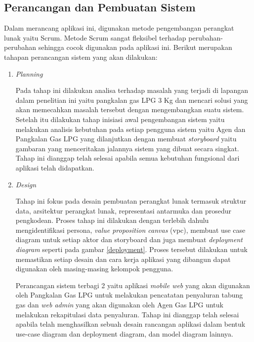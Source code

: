 \subsection{Perancangan dan Pembuatan Sistem}
Dalam merancang aplikasi ini, digunakan metode pengembangan perangkat lunak yaitu Scrum. Metode Scrum sangat fleksibel terhadap perubahan-perubahan sehingga cocok digunakan pada aplikasi ini. Berikut merupakan tahapan perancangan sistem yang akan dilakukan:

\begin{enumerate}[1.]
	\item \emph {Planning}
	
	Pada tahap ini dilakukan analisa terhadap masalah yang terjadi di lapangan dalam penelitian ini yaitu pangkalan gas LPG 3 Kg dan mencari solusi yang akan memecahkan masalah tersebut dengan mengembangkan suatu sistem. Setelah itu dilakukan tahap inisiasi awal pengembangan sistem yaitu melakukan analisis kebutuhan pada setiap pengguna sistem yaitu Agen dan Pangkalan Gas LPG yang dilanjutkan dengan membuat \textit{storyboard} yaitu gambaran yang menceritakan jalannya sistem yang dibuat secara singkat. Tahap ini dianggap telah selesai apabila semua kebutuhan fungsional dari aplikasi telah didapatkan.
	
	

	\item \textit{Design}
	
	\par Tahap ini fokus pada desain pembuatan perangkat lunak termasuk struktur data, arsitektur perangkat lunak, representasi antarmuka dan prosedur pengkodean. Proses tahap ini dilakukan dengan terlebih dahulu mengidentifikasi persona, \textit{value proposition canvas} (vpc), membuat use case diagram untuk setiap aktor dan storyboard dan juga membuat \textit{deployment diagram} seperti pada gambar \ref{deployment}. Proses tersebut dilakukan untuk memastikan setiap desain dan cara kerja aplikasi yang dibangun dapat digunakan oleh masing-masing kelompok pengguna.
	\par Perancangan sistem terbagi 2 yaitu aplikasi \textit{mobile web} yang akan digunakan oleh Pangkalan Gas LPG untuk melakukan pencatatan penyaluran tabung gas dan \textit{web admin} yang akan digunakan oleh Agen Gas LPG untuk melakukan rekapitulasi data penyaluran. Tahap ini dianggap telah selesai apabila telah menghasilkan sebuah desain rancangan aplikasi dalam bentuk use-case diagram dan deployment diagram, dan model diagram lainnya.
	

\end{enumerate}
